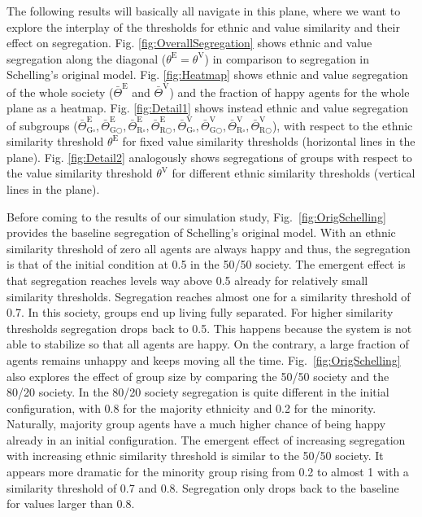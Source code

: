 \documentclass{ws-acs}
\begin{document}
{The following results will basically all navigate in this plane, where we want to explore the interplay of the thresholds for ethnic and value similarity and their effect on segregation. Fig. \ref{fig:OverallSegregation} shows ethnic and value segregation along the diagonal ($\theta^\text{E} = \theta^\text{V}$) in comparison to segregation in Schelling's original model. Fig. \ref{fig:Heatmap} shows ethnic and value segregation of the whole society ($\bar\Theta^\text{E}$ and $\bar\Theta^\text{V}$) and the fraction of happy agents for the whole plane as a heatmap. Fig. \ref{fig:Detail1} shows instead ethnic and value segregation of subgroups ($\bar\Theta^\text{E}_{\text{G}\square}, \bar\Theta^\text{E}_{\text{G}\bigcirc}, \bar\Theta^\text{E}_{\text{R}\square}, \bar\Theta^\text{E}_{\text{R}\bigcirc}, \bar\Theta^\text{V}_{\text{G}\square}, \bar\Theta^\text{V}_{\text{G}\bigcirc}, \bar\Theta^\text{V}_{\text{R}\square}, \bar\Theta^\text{V}_{\text{R}\bigcirc}$), with respect to the ethnic similarity threshold $\theta^\text{E}$ for fixed value similarity thresholds (horizontal lines in the plane). Fig. \ref{fig:Detail2} analogously shows segregations of groups with respect to the value similarity threshold $\theta^\text{V}$ for different ethnic similarity thresholds (vertical lines in the plane). 

Before coming to the results of our simulation study, Fig.~\ref{fig:OrigSchelling} provides the baseline segregation of Schelling's original model. With an ethnic similarity threshold of zero all agents are always happy and thus, the segregation is that of the initial condition at 0.5 in the 50/50 society. The emergent effect is that segregation reaches levels way above 0.5 already for relatively small similarity thresholds. Segregation reaches almost one for a similarity threshold of 0.7. In this society, groups end up living fully separated. For higher similarity thresholds segregation drops back to 0.5. This happens because the system is not able to stabilize so that all agents are happy. On the contrary, a large fraction of agents remains unhappy and keeps moving all the time. Fig.~\ref{fig:OrigSchelling} also explores the effect of group size by comparing the 50/50 society and the 80/20 society. In the 80/20 society segregation is quite different in the initial configuration, with 0.8 for the majority ethnicity and 0.2 for the minority. Naturally, majority group agents have a much higher chance of being happy already in an initial configuration. The emergent effect of increasing segregation with increasing ethnic similarity threshold is similar to the 50/50 society. It appears more dramatic for the minority group rising from 0.2 to almost 1 with a similarity threshold of 0.7 and 0.8. Segregation only drops back to the baseline for values larger than 0.8. 

}
\end{document}
